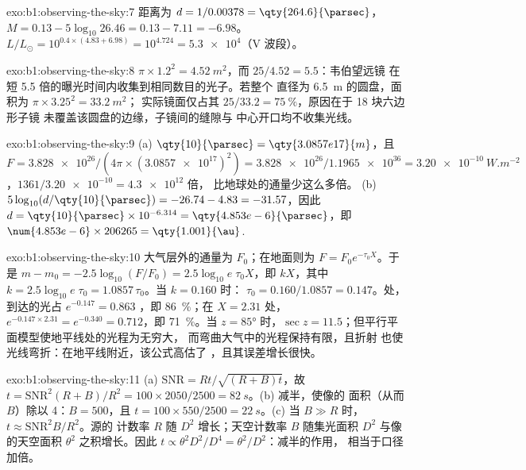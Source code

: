\begin{solution}{exo:b1:observing-the-sky:7}
距离为 $d = 1/0.00378 = \qty{264.6}{\parsec}$， $M = 0.13 - 5\log_{10}26.46 = 0.13 - 7.11 = -6.98$。$L/L_\odot = 10^{0.4\times(4.83 + 6.98)} =
10^{4.724} = \num{5.3e4}$（V 波段）。
\end{solution}

\begin{solution}{exo:b1:observing-the-sky:8}
$\pi\times1.2^2 = \qty{4.52}{m^2}$，而 $25/4.52 = 5.5$：韦伯望远镜
在短 5.5 倍的曝光时间内收集到相同数目的光子。若整个
直径为 \qty{6.5}{m} 的圆盘，面积为 $\pi\times3.25^2 = \qty{33.2}{m^2}$；
实际镜面仅占其 $25/33.2 = \qty{75}{\percent}$，原因在于 18 块六边形子镜
未覆盖该圆盘的边缘，子镜间的缝隙与
中心开口均不收集光线。
\end{solution}

\begin{solution}{exo:b1:observing-the-sky:9}
(a) $\qty{10}{\parsec} = \qty{3.0857e17}{m}$，且 $F = \num{3.828e26}/(4\pi
\times(\num{3.0857e17})^2) = \num{3.828e26}/\num{1.1965e36} =
\qty{3.20e-10}{W.m^{-2}}$，$1361/\num{3.20e-10} = \num{4.3e12}$ 倍，
比地球处的通量少这么多倍。
(b) $5\log_{10}(d/\qty{10}{\parsec}) = -26.74 - 4.83 = -31.57$，因此
$d = \qty{10}{\parsec}\times10^{-6.314} = \qty{4.853e-6}{\parsec}$，即
$\num{4.853e-6}\times206265 = \qty{1.001}{\au}$.
\end{solution}

\begin{solution}{exo:b1:observing-the-sky:10}
大气层外的通量为 $F_0$；在地面则为 $F = F_0e^{-\tau_0X}$。于是
$m - m_0 = -2.5\log_{10}(F/F_0) = 2.5\log_{10}e\;\tau_0X$，即 $kX$，其中
$k = 2.5\log_{10}e\;\tau_0 = 1.0857\,\tau_0$。当 $k = 0.160$ 时：
$\tau_0 = 0.160/1.0857 = 0.147$。处，到达的光占 $e^{-0.147} = 0.863$
，即 \qty{86}{\percent}；在 $X = 2.31$ 处，$e^{-0.147\times2.31} =
e^{-0.340} = 0.712$，即 \qty{71}{\percent}。当 $z = \ang{85}$ 时，$\sec z =
11.5$；但平行平面模型使地平线处的光程为无穷大，
而弯曲大气中的光程保持有限，且折射
也使光线弯折：在地平线附近，该公式高估了
，且其误差增长很快。
\end{solution}

\begin{solution}{exo:b1:observing-the-sky:11}
(a) $\mathrm{SNR} = Rt/\sqrt{(R + B)t}$，故 $t = \mathrm{SNR}^2(R + B)/R^2
= 100\times2050/2500 = \qty{82}{s}$。(b) 减半，使像的
面积（从而 $B$）除以 4：$B = 500$，且 $t = 100\times550/2500 =
\qty{22}{s}$。(c) 当 $B \gg R$ 时，$t \approx \mathrm{SNR}^2B/R^2$。源的
计数率 $R$ 随 $D^2$ 增长；天空计数率 $B$ 随集光面积
$D^2$ 与像的天空面积 $\theta^2$ 之积增长。因此 $t \propto
\theta^2D^2/D^4 = \theta^2/D^2$：减半的作用，
相当于口径加倍。
\end{solution}

